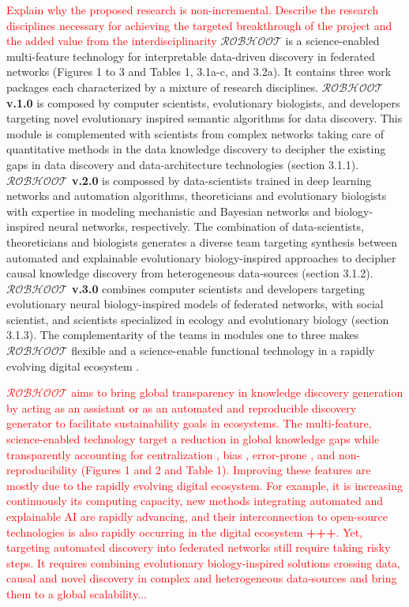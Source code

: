 \documentclass[11pt, a4paper]{article} %
\begin{document}
\textcolor{red}{Explain why the proposed research is
  non-incremental. Describe the research disciplines necessary for
  achieving the targeted breakthrough of the project and the added
  value from the interdisciplinarity} {\bf $\mathcal{ROBHOOT}$} is a
science-enabled multi-feature technology for interpretable data-driven
discovery in federated networks (Figures 1 to 3 and Tables 1, 3.1a-c,
and 3.2a). It contains three work packages each characterized by a
mixture of research disciplines. {\bf $\mathcal{ROBHOOT}$ v.1.0} is
composed by computer scientists, evolutionary biologists, and
developers targeting novel evolutionary inspired semantic algorithms
for data discovery. This module is complemented with scientists from
complex networks taking care of quantitative methods in the data
knowledge discovery to decipher the existing gaps in data discovery
and data-architecture technologies (section 3.1.1). {\bf
  $\mathcal{ROBHOOT}$ v.2.0} is compossed by data-scientists trained
in deep learning networks and automation algorithms, theoreticians and
evolutionary biologists with expertise in modeling mechanistic and
Bayesian networks and biology-inspired neural networks,
respectively. The combination of data-scientists, theoreticians and
biologists generates a diverse team targeting synthesis between
automated and explainable evolutionary biology-inspired approaches to
decipher causal knowledge discovery from heterogeneous data-sources
(section 3.1.2). {\bf $\mathcal{ROBHOOT}$ v.3.0} combines computer
scientists and developers targeting evolutionary neural
biology-inspired models of federated networks, with social scientist,
and scientists specialized in ecology and evolutionary biology
(section 3.1.3). The complementarity of the teams in modules one to
three makes $\mathcal{ROBHOOT}$ flexible and a science-enable
functional technology in a rapidly evolving digital ecosystem
\citep{Soto-Valero2019}.

\textcolor{red}{$\mathcal{ROBHOOT}$ aims to bring global transparency
  in knowledge discovery generation by acting as an assistant or as an
  automated and reproducible discovery generator to facilitate
  sustainability goals in ecosystems. The multi-feature,
  science-enabled technology target a reduction in global knowledge
  gaps while transparently accounting for centralization
  \citep{Inhaber1977,Gunther2018}⁠⁠, bias⁠⁠ \citep{Ioannidis2005},
  error-prone \citep{Fang2011}, and non-reproducibility
  \citep{Hardwicke2018} (Figures 1 and 2 and Table 1). Improving these
  features are mostly due to the rapidly evolving digital
  ecosystem. For example, it is increasing continuously its computing
  capacity, new methods integrating automated and explainable AI are
  rapidly advancing, and their interconnection to open-source
  technologies is also rapidly occurring in the digital ecosystem {\bf
    +++}. Yet, targeting automated discovery into federated networks
  still require taking risky steps. It requires combining evolutionary
  biology-inspired solutions crossing data, causal and novel discovery
  in complex and heterogeneous data-sources and bring them to a global
  scalability...}
\end{document}
